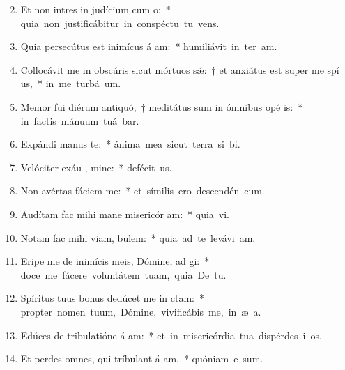 \begin{flushleft}
\begin{enumerate}[leftmargin=*]
\setcounter{enumi}{1}

\item Et non intres in judícium cum  o:~* \mbox{quia non justificábitur in conspéctu tu  vens.}
\item Quia persecútus est inimícus á am:~* \mbox{humiliávit in ter  am.}
\item Collocávit me in obscúris sicut mórtuos s\'{\ae}:~† et anxiátus est super me spí us,~* \mbox{in me turbá   um.}
\item Memor fui diérum antiquó,~† meditátus sum in ómnibus opé is:~* \mbox{in factis mánuum tuá bar.}
\item Expándi manus   te:~* \mbox{ánima mea sicut terra si  bi.}
\item Velóciter exáu , mine:~* \mbox{defécit  us.}
\item Non avértas fáciem   me:~* \mbox{et símilis ero descendén  cum.}
\item Audítam fac mihi mane misericór am:~* \mbox{quia   vi.}
\item Notam fac mihi viam,   bulem:~* \mbox{quia ad te levávi  am.}
\item Eripe me de inimícis meis, Dómine, ad  gi:~* \mbox{doce me fácere voluntátem tuam, quia De   tu.}
\item Spíritus tuus bonus dedúcet me in  ctam:~* \mbox{propter nomen tuum, Dómine, vivificábis me, in æ a.}
\item Edúces de tribulatióne á am:~* \mbox{et in misericórdia tua dispérdes i os.}
\item Et perdes omnes, qui tríbulant á am,~* \mbox{quóniam e   sum.}

\end{enumerate}
\end{flushleft}

